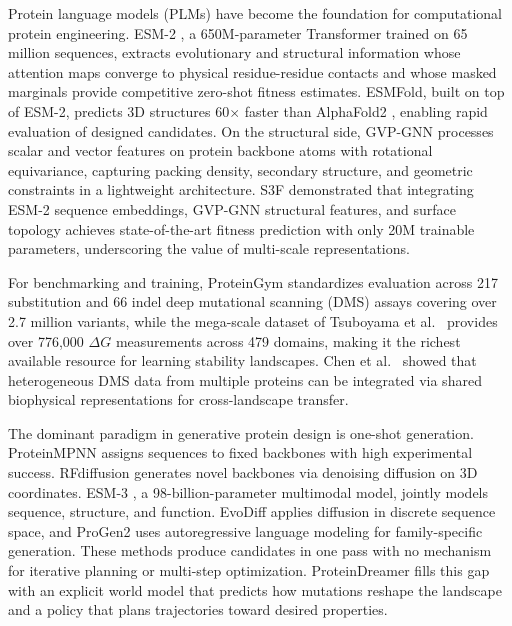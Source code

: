 \documentclass[12pt, a4paper]{article}
\begin{document}
Protein language models (PLMs) have become the foundation for computational protein engineering. ESM-2 \citep{lin2023esm2}, a 650M-parameter Transformer trained on 65 million sequences, extracts evolutionary and structural information whose attention maps converge to physical residue-residue contacts and whose masked marginals provide competitive zero-shot fitness estimates. ESMFold, built on top of ESM-2, predicts 3D structures 60$\times$ faster than AlphaFold2 \citep{jumper2021alphafold}, enabling rapid evaluation of designed candidates. On the structural side, GVP-GNN \citep{jing2021gvp} processes scalar and vector features on protein backbone atoms with rotational equivariance, capturing packing density, secondary structure, and geometric constraints in a lightweight architecture. S3F \citep{zhang2024s3f} demonstrated that integrating ESM-2 sequence embeddings, GVP-GNN structural features, and surface topology achieves state-of-the-art fitness prediction with only 20M trainable parameters, underscoring the value of multi-scale representations.

For benchmarking and training, ProteinGym \citep{notin2023proteingym} standardizes evaluation across 217 substitution and 66 indel deep mutational scanning (DMS) assays covering over 2.7 million variants, while the mega-scale dataset of Tsuboyama et al.\ \citep{tsuboyama2023megascale} provides over 776,000 $\Delta G$ measurements across 479 domains, making it the richest available resource for learning stability landscapes. Chen et al.\ \citep{chen2023dmslandscapes} showed that heterogeneous DMS data from multiple proteins can be integrated via shared biophysical representations for cross-landscape transfer.

The dominant paradigm in generative protein design is one-shot generation. ProteinMPNN \citep{dauparas2022proteinmpnn} assigns sequences to fixed backbones with high experimental success. RFdiffusion \citep{watson2023rfdiffusion} generates novel backbones via denoising diffusion on 3D coordinates. ESM-3 \citep{hayes2024esm3}, a 98-billion-parameter multimodal model, jointly models sequence, structure, and function. EvoDiff \citep{alamdari2023evodiff} applies diffusion in discrete sequence space, and ProGen2 \citep{nijkamp2023progen2} uses autoregressive language modeling for family-specific generation. These methods produce candidates in one pass with no mechanism for iterative planning or multi-step optimization. ProteinDreamer fills this gap with an explicit world model that predicts how mutations reshape the landscape and a policy that plans trajectories toward desired properties.
\end{document}
